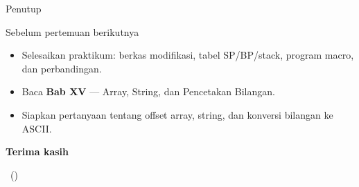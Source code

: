 \documentclass[aspectratio=169,11pt]{beamer}
\begin{document}
\begin{frame}{Penutup}
\begin{block}{Sebelum pertemuan berikutnya}
\small
\begin{itemize}
    \item Selesaikan praktikum: berkas  modifikasi,
          tabel SP/BP/stack, program macro, dan perbandingan.
    \item Baca \textbf{Bab XV} — Array, String, dan Pencetakan
          Bilangan.
    \item Siapkan pertanyaan tentang offset array, string, dan
          konversi bilangan ke ASCII.
\end{itemize}
\end{block}

\vspace{0.4em}
\begin{center}
{\color{obeBlue}\sffamily\large\bfseries Terima kasih\par}
\vspace{0.15em}
{\color{obeGray}\sffamily\small \NamaMK\ (\KodeMK)
\textbullet\ \SemesterTeks\par}
\end{center}
\end{frame}
\end{document}
